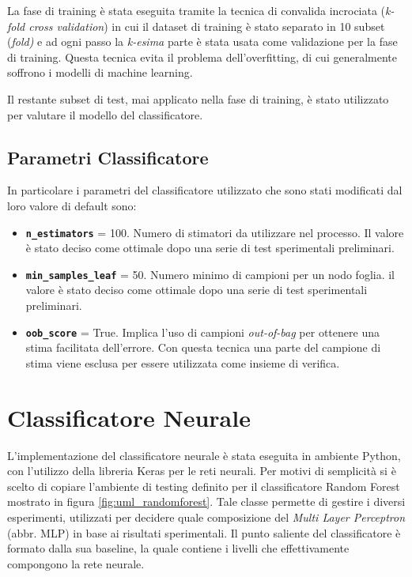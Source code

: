 La fase di training è stata eseguita tramite la tecnica di convalida incrociata (\textit{k-fold cross validation}) in cui il dataset di training è stato separato in 10 subset (\textit{fold)} e ad ogni passo la \textit{k-esima} parte è stata usata come validazione per la fase di training. Questa tecnica evita il problema dell'overfitting, di cui generalmente soffrono i modelli di machine learning.

Il restante subset di test, mai applicato nella fase di training, è stato utilizzato per valutare il modello del classificatore.


\subsection{Parametri Classificatore}
In particolare i parametri del classificatore utilizzato che sono stati modificati dal loro valore di default sono:
\begin{itemize}
\item \textbf{\texttt{n\_estimators}} = 100. Numero di stimatori da utilizzare nel processo. Il valore è stato deciso come ottimale dopo una serie di test sperimentali preliminari.
\item \textbf{\texttt{min\_samples\_leaf}} = 50. Numero minimo di campioni per un nodo foglia. il valore è stato deciso come ottimale dopo una serie di test sperimentali preliminari.
\item \textbf{\texttt{oob\_score}} = True. Implica l'uso di campioni \textit{out-of-bag} per ottenere una stima facilitata dell'errore. Con questa tecnica una parte del campione di stima viene esclusa per essere utilizzata come insieme di verifica.
\end{itemize}

\newpage
\section{Classificatore Neurale}
\label{imp:classneurale}
L'implementazione del classificatore neurale è stata eseguita in ambiente Python, con l'utilizzo della libreria Keras \cite{keras} per le reti neurali.
Per motivi di semplicità si è scelto di copiare l'ambiente di testing definito per il classificatore Random Forest mostrato in figura  \ref{fig:uml_randomforest}. Tale classe permette di gestire i diversi esperimenti, utilizzati per decidere quale composizione del \textit{Multi Layer Perceptron}  (abbr. MLP) in base ai risultati sperimentali. 
Il punto saliente del classificatore è formato dalla sua baseline, la quale contiene i livelli che effettivamente compongono la rete neurale.

